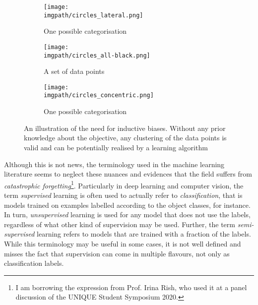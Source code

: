 {\begin{figure}[htb]
  \centering
  \begin{subfigure}{0.32 \linewidth}
      \texttt{[image: \\imgpath/circles\_lateral.png]}
      \caption{One possible categorisation}
      \label{fig:lateral}
  \end{subfigure}
  \begin{subfigure}{0.32 \linewidth}
      \texttt{[image: \\imgpath/circles\_all-black.png]}
      \caption{A set of data points}
      \label{fig:allblack}
  \end{subfigure}
  \begin{subfigure}{0.32 \linewidth}
      \texttt{[image: \\imgpath/circles\_concentric.png]}
      \caption{One possible categorisation}
      \label{fig:concentric}
  \end{subfigure}
  \caption{An illustration of the need for inductive biases. Without any prior knowledge about the objective, any clustering of the data points is valid and can be potentially realised by a learning algorithm}
  \label{fig:unsupervised}
\end{figure}

Although this is not news, the terminology used in the machine learning literature seems to neglect these nuances and evidences that the field suffers from \textit{catastrophic forgetting}\footnote{I am borrowing the expression from Prof. Irina Rish, who used it at a panel discussion of the UNIQUE Student Symposium 2020.}. Particularly in deep learning and computer vision, the term \textit{supervised} learning is often used to actually refer to \textit{classification}, that is models trained on examples labelled according to the object classes, for instance. In turn, \textit{unsupervised} learning is used for any model that does not use the labels, regardless of what other kind of supervision may be used. Further, the term \textit{semi-supervised} learning refers to models that are trained with a fraction of the labels. While this terminology may be useful in some cases, it is not well defined and misses the fact that supervision can come in multiple flavours, not only as classification labels.

}
